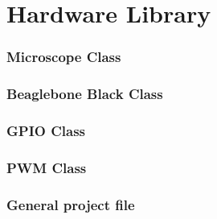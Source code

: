 \documentclass[11pt,fleqn]{book} %
\begin{document}
\chapter{Hardware Library}
\subsection{Microscope Class}

\newpage

\newpage
\subsection{Beaglebone Black Class}

\newpage

\newpage
\subsection{GPIO Class}

\newpage

\newpage
\subsection{PWM Class}

\newpage

\newpage
\subsection{General project file}

\newpage

\newpage

\newpage

\newpage

\newpage

\newpage

\end{document}

